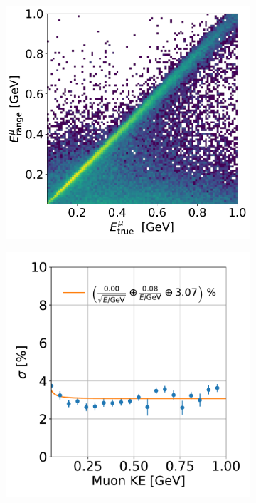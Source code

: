 \begin{figure}[H]
\begin{center}
\begin{subfigure}[b]{0.38\textwidth}
    \end{subfigure}
    \begin{subfigure}[b]{0.4\textwidth}
    \centering
    \includegraphics[width=1.00\textwidth]{ereco/muon_range_eres2D.pdf}
    \end{subfigure}
    \begin{subfigure}[b]{0.38\textwidth}
    \centering
    \includegraphics[width=1.00\textwidth]{ereco/muon_range_eres_vs_true.pdf}

\end{subfigure}
\end{center}
\end{figure}
